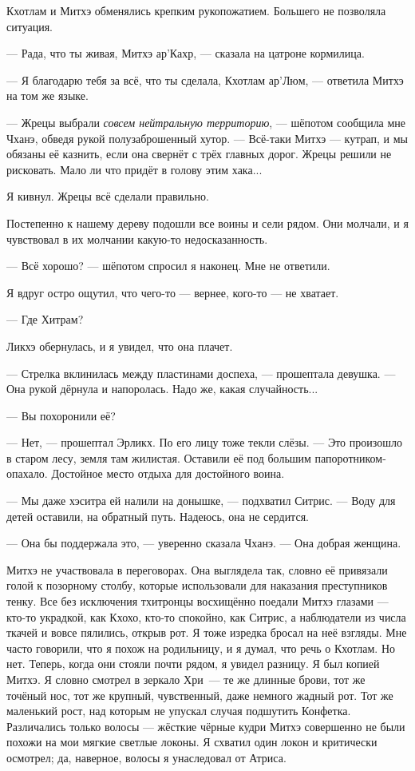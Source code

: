 Кхотлам и Митхэ обменялись крепким рукопожатием.
Большего не позволяла ситуация.

--- Рада, что ты живая, Митхэ ар'Кахр, --- сказала на цатроне кормилица.

--- Я благодарю тебя за всё, что ты сделала, Кхотлам ар'Люм, --- ответила Митхэ на том же языке.

--- Жрецы выбрали \emph{совсем нейтральную территорию}, --- шёпотом сообщила мне Чханэ, обведя рукой полузаброшенный хутор.
--- Всё-таки Митхэ --- кутрап, и мы обязаны её казнить, если она свернёт с трёх главных дорог.
Жрецы решили не рисковать.
Мало ли что придёт в голову этим хака...

Я кивнул.
Жрецы всё сделали правильно.

Постепенно к нашему дереву подошли все воины и сели рядом.
Они молчали, и я чувствовал в их молчании какую-то недосказанность.

--- Всё хорошо? --- шёпотом спросил я наконец.
Мне не ответили.

Я вдруг остро ощутил, что чего-то --- вернее, кого-то --- не хватает.

--- Где Хитрам?

Ликхэ обернулась, и я увидел, что она плачет.

--- Стрелка вклинилась между пластинами доспеха, --- прошептала девушка.
--- Она рукой дёрнула и напоролась.
Надо же, какая случайность...

--- Вы похоронили её?

--- Нет, --- прошептал Эрликх.
По его лицу тоже текли слёзы.
--- Это произошло в старом лесу, земля там жилистая.
Оставили её под большим папоротником-опахало.
Достойное место отдыха для достойного воина.

--- Мы даже хэситра ей налили на донышке, --- подхватил Ситрис.
--- Воду для детей оставили, на обратный путь.
Надеюсь, она не сердится.

--- Она бы поддержала это, --- уверенно сказала Чханэ.
--- Она добрая женщина.

Митхэ не участвовала в переговорах.
Она выглядела так, словно её привязали голой к позорному столбу, которые использовали для наказания преступников тенку.
Все без исключения тхитронцы восхищённо поедали Митхэ глазами --- кто-то украдкой, как Кхохо, кто-то спокойно, как Ситрис, а наблюдатели из числа ткачей и вовсе пялились, открыв рот.
Я тоже изредка бросал на неё взгляды.
Мне часто говорили, что я похож на родильницу, и я думал, что речь о Кхотлам.
Но нет.
Теперь, когда они стояли почти рядом, я увидел разницу.
Я был копией Митхэ.
Я словно смотрел в зеркало Хри\FM\ --- те же длинные брови, тот же точёный нос, тот же крупный, чувственный, даже немного жадный рот.
Тот же маленький рост, над которым не упускал случая подшутить Конфетка.
Различались только волосы --- жёсткие чёрные кудри Митхэ совершенно не были похожи на мои мягкие светлые локоны.
Я схватил один локон и критически осмотрел;
да, наверное, волосы я унаследовал от Атриса.

